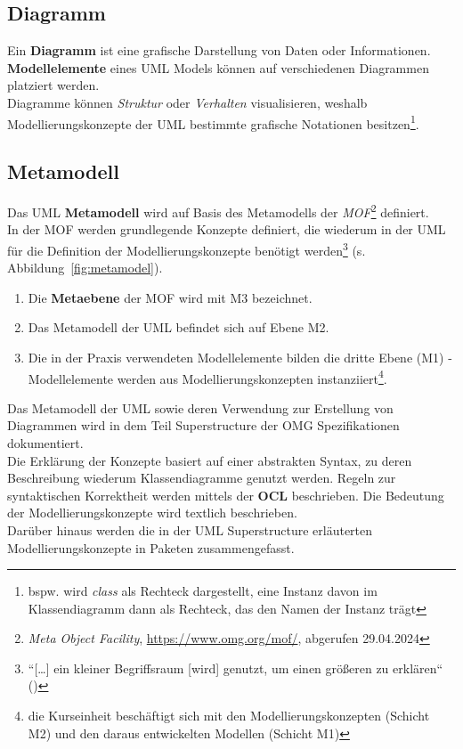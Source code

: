 \subsection*{Diagramm}
Ein \textbf{Diagramm} ist eine grafische Darstellung von Daten oder Informationen.\\
\textbf{Modellelemente} eines UML Models können auf verschiedenen Diagrammen platziert werden.\\
Diagramme können \textit{Struktur} oder \textit{Verhalten} visualisieren, weshalb Modellierungskonzepte der UML bestimmte grafische Notationen besitzen\footnote{
bspw. wird \textit{class} als Rechteck dargestellt, eine Instanz davon im Klassendiagramm dann als Rechteck, das den Namen der Instanz trägt
}.

\subsection*{Metamodell}
Das UML \textbf{Metamodell} wird auf Basis des Metamodells der \textit{MOF}\footnote{
\textit{Meta Object Facility}, \url{https://www.omg.org/mof/}, abgerufen 29.04.2024
} definiert.\\
In der MOF werden grundlegende Konzepte definiert, die wiederum in der UML für die Definition der Modellierungskonzepte benötigt werden\footnote{
``[\ldots] ein kleiner Begriffsraum [wird] genutzt, um einen größeren zu erklären`` (\cite[5]{Buh09})
} (s. Abbildung~\ref{fig:metamodel}).

\begin{enumerate}
    \item Die \textbf{Metaebene} der MOF wird mit M3 bezeichnet.
    \item Das Metamodell der UML befindet sich auf Ebene M2.
    \item Die in der Praxis verwendeten Modellelemente bilden die dritte Ebene (M1) - Modellelemente werden aus Modellierungskonzepten instanziiert\footnote{
    die Kurseinheit beschäftigt sich mit den Modellierungskonzepten (Schicht M2) und den daraus entwickelten Modellen (Schicht M1)
    }.
\end{enumerate}

\noindent
Das Metamodell der UML sowie deren Verwendung zur Erstellung von Diagrammen wird in dem Teil Superstructure der OMG Spezifikationen dokumentiert.\\
Die Erklärung der Konzepte basiert auf einer abstrakten Syntax, zu deren Beschreibung wiederum Klassendiagramme genutzt werden.
Regeln zur syntaktischen Korrektheit werden mittels der \textbf{OCL} beschrieben.
Die Bedeutung der Modellierungskonzepte wird textlich beschrieben.\\
Darüber hinaus werden die in der UML Superstructure erläuterten Modellierungskonzepte in Paketen zusammengefasst.

